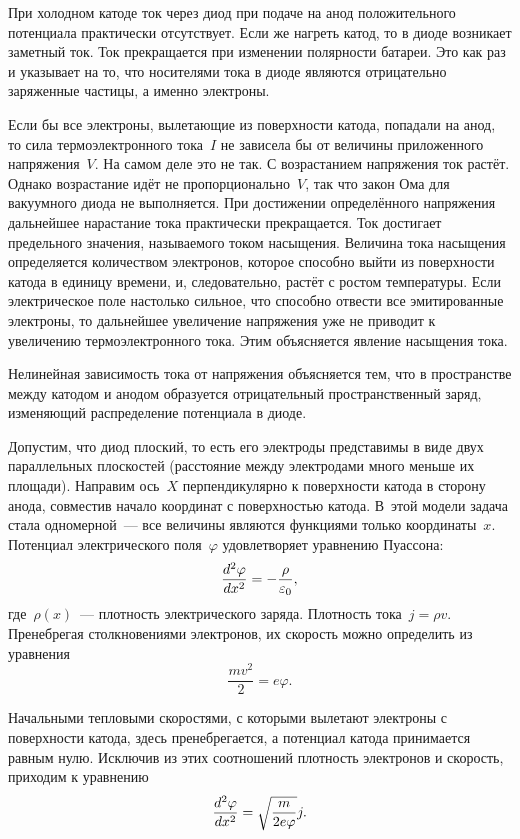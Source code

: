 При холодном катоде ток через диод при подаче на анод положительного потенциала
практически отсутствует. Если же нагреть катод, то в диоде возникает заметный
ток. Ток прекращается при изменении полярности батареи. Это как раз и указывает
на то, что носителями тока в диоде являются отрицательно заряженные частицы, а
именно электроны.

Если бы все электроны, вылетающие из поверхности катода, попадали на анод, то
сила термоэлектронного тока~$I$ не
зависела бы от величины приложенного напряжения~$V$. На самом деле это не так. С
возрастанием напряжения ток растёт.
Однако возрастание идёт не пропорционально~$V$, так что закон Ома для вакуумного
диода не выполняется. При достижении определённого напряжения дальнейшее
нарастание тока практически прекращается. Ток достигает предельного значения,
называемого током насыщения. Величина тока насыщения определяется количеством
электронов, которое способно выйти из поверхности катода в единицу времени, и,
следовательно, растёт с ростом температуры. Если электрическое поле настолько
сильное, что способно отвести все эмитированные электроны, то дальнейшее
увеличение напряжения уже не приводит к увеличению термоэлектронного тока. Этим
объясняется явление насыщения тока.

Нелинейная зависимость тока от напряжения объясняется тем, что в пространстве
между катодом и анодом образуется
отрицательный пространственный заряд, изменяющий распределение потенциала в
диоде.

Допустим, что диод плоский, то есть его электроды представимы в виде двух
параллельных плоскостей (расстояние между
электродами много меньше их площади). Направим ось~$X$ перпендикулярно к
поверхности катода в сторону анода, совместив начало координат с поверхностью
катода. В~этой модели задача стала одномерной~--- все величины являются
функциями только координаты~$x$. Потенциал электрического поля~$\varphi$
удовлетворяет уравнению Пуассона:
\begin{equation}
	\eqmark{3.14}
	\frac{d^2\varphi}{dx^2}=-\frac{\rho}{\varepsilon_0},
\end{equation}
где~$\rho(x)$~--- плотность электрического заряда. Плотность тока~$j=\rho v$.
Пренебрегая столкновениями электронов, их скорость можно определить из уравнения
\begin{equation*}
	\frac{mv^2}{2}=e\varphi.
\end{equation*}

Начальными тепловыми скоростями, с которыми вылетают электроны с поверхности
катода, здесь пренебрегается, а потенциал катода принимается равным нулю.
Исключив из этих соотношений плотность электронов и скорость, приходим к
уравнению
\begin{equation}
	\eqmark{3.15}
	\frac{d^2\varphi}{dx^2}=\sqrt{\frac{m}{2e\varphi}} j.
\end{equation}

